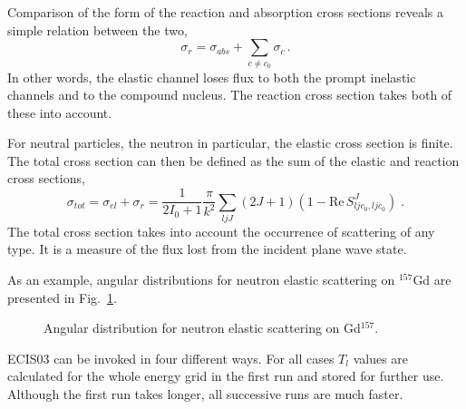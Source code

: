 Comparison of the form of the reaction and absorption cross sections reveals
a simple relation between the two, 
\begin{equation}
\sigma_{r}=\sigma_{abs}+\sum_{c\neq c_{0}}\sigma_{c}\,.
\end{equation}
In other words, the elastic channel loses flux to both the prompt inelastic
channels and to the compound nucleus. The reaction cross section takes both
of these into account.

For neutral particles, the neutron in particular, the elastic cross section
is finite. The total cross section can then be defined as the sum of the
elastic and reaction cross sections, 
\begin{equation}
\sigma _{tot}=\sigma _{el}+\sigma _{r}=\frac{1}{2I_{0}+1}\frac{\pi }{k^{2}}%
\sum_{ljJ}(2J+1)(1-\text{Re}\,S_{ljc_{0},ljc_{0}}^{J})\;.
\end{equation}%
The total cross section takes into account the occurrence of scattering of
any type. It is a measure of the flux lost from the incident plane wave
state.

As an example, angular distributions for neutron elastic scattering on $%
^{157}$Gd are presented in Fig.~\ref{njoygd157}. 
\begin{figure}[htbp]
\caption{Angular distribution for neutron elastic scattering on Gd$^{157}$.}
\label{njoygd157}
\end{figure}

ECIS03%
 can be invoked in four different ways. For all cases $T_{l}$
values are calculated for the whole energy grid in the first run and stored
for further use. Although the first run takes longer, all successive runs
are much faster.

